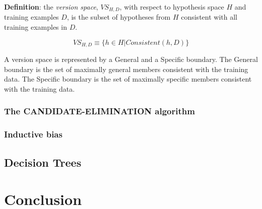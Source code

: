 \documentclass[10pt,a4paper]{article}
\begin{document}
\textbf{Definition}: the \emph{version space}, $VS_{H,D}$, with respect to hypothesis space $H$ and training examples $D$, is the subset of hypotheses from $H$ consistent with all training examples in $D$.

\begin{equation}
VS_{H,D} \equiv \{h \in H | Consistent(h,D)\}
\end{equation}

A version space is represented by a General and a Specific boundary. The General boundary is the set of maximally general members consistent with the training data. The Specific boundary is the set of maximally specific members consistent with the training data.  

\citep{stan,Riedmiller}

\subsubsection{The CANDIDATE-ELIMINATION algorithm}

\subsubsection{Inductive bias}
\subsection{Decision Trees}

\section{Conclusion}


\end{document}
